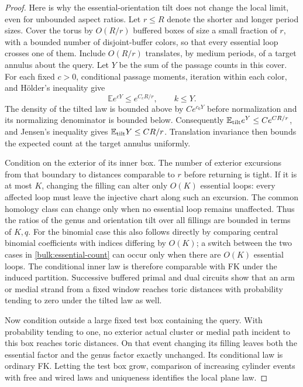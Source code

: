 \begin{proof}
Here is why the essential-orientation tilt does not change the
local limit, even for unbounded aspect ratios. Let $r\le R$ denote
the shorter and longer period sizes. Cover the torus by $O(R/r)$
buffered boxes of size a small fraction of $r$, with a bounded
number of disjoint-buffer colors, so that every essential loop
crosses one of them. Include $O(R/r)$ translates, by medium periods,
of a target annulus about the query. Let $Y$ be the sum of the
passage counts in this cover. For each fixed $c>0$, conditional
passage moments, iteration within each color, and H\"older's
inequality give
\begin{equation}\label{bulk:torus-moment}
 \mathbb E e^{cY}\le e^{C_cR/r},\qquad k\le Y.
\end{equation}
The density of the tilted law is bounded above by $C e^{c_0Y}$
before normalization and its normalizing denominator is bounded
below. Consequently
$\mathbb E_{\rm tilt}e^Y\le C e^{CR/r}$, and Jensen's inequality
gives $\mathbb E_{\rm tilt}Y\le CR/r$. Translation invariance then
bounds the expected count at the target annulus uniformly.

Condition on the exterior of its inner box. The number of exterior
excursions from that boundary to distances comparable to $r$ before
returning is tight. If it is at most $K$, changing the filling
can alter only $O(K)$ essential loops: every affected loop must
leave the injective chart along such an excursion. The common
homology class can change only when no essential loop remains
unaffected. Thus the ratios of the genus and orientation tilt over
all fillings are bounded in terms of $K,q$. For the binomial case
this also follows directly by comparing central binomial
coefficients with indices differing by $O(K)$; a switch between
the two cases in \eqref{bulk:essential-count} can occur only when
there are $O(K)$ essential loops. The conditional inner law is
therefore comparable with FK under the induced partition.
Successive buffered primal and dual circuits show that an arm or
medial strand from a fixed window reaches toric distances with
probability tending to zero under the tilted law as well.

Now condition outside a large fixed test box containing the query.
With probability tending to one, no exterior actual cluster or
medial path incident to this box reaches toric distances. On that
event changing its filling leaves both the essential factor and
the genus factor exactly unchanged. Its conditional law is
ordinary FK. Letting the test box grow, comparison of increasing
cylinder events with free and wired laws and uniqueness identifies
the local plane law.


\end{proof}
